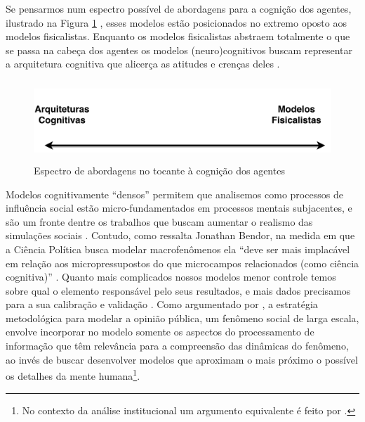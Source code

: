 Se pensarmos num espectro possível de abordagens para a cognição dos agentes,
ilustrado na Figura \ref{fig4} , esses modelos estão posicionados no extremo oposto aos
modelos fisicalistas. Enquanto os modelos fisicalistas abstraem totalmente o que
se passa na cabeça dos agentes os modelos (neuro)cognitivos buscam representar a
arquitetura cognitiva que alicerça as atitudes e crenças
deles \cite{kim2010computational}.

\begin{figure}[H]
  \centering
  \includegraphics[width = \textwidth, height = 3cm]{ims/line.pdf}
  \caption{Espectro de abordagens no tocante à cognição dos agentes}
  \label{fig4}
\end{figure}

Modelos cognitivamente ``densos'' permitem que analisemos como processos de
influência social estão micro-fundamentados em processos mentais subjacentes, e
são um fronte dentre os trabalhos que buscam aumentar o realismo das simulações
sociais \cite{jager2017,epstein2014agent_zero, conte2013minding}. Contudo, como
ressalta Jonathan Bendor, na medida em que a Ciência Política busca modelar
macrofenômenos ela ``deve ser mais implacável em relação aos micropressupostos
do que microcampos relacionados (como ciência cognitiva)''
\cite[p.45]{bendor2010bounded}. Quanto mais complicados nossos modelos menor
controle temos sobre qual o elemento responsável pelo seus resultados, e mais
dados precisamos para a sua calibração e validação \cite{de2005computational,
  bendor2010bounded}. Como argumentado por , a
estratégia metodológica para modelar a opinião pública, um fenômeno social de
larga escala, envolve incorporar no modelo somente os aspectos do processamento
de informação que têm relevância para a compreensão das dinâmicas do fenômeno,
ao invés de buscar desenvolver modelos que aproximam o mais próximo o possível
os detalhes da mente humana\footnote{No contexto da análise institucional um
  argumento equivalente é feito por .}.


